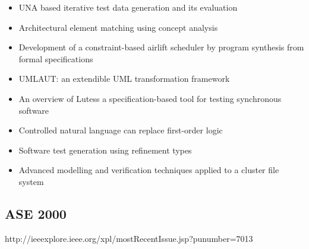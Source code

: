 {\begin{itemize}[itemsep=-1ex]
  \item UNA based iterative test data generation and its evaluation
  \item Architectural element matching using concept analysis
  \item Development of a constraint-based airlift scheduler by program synthesis from formal specifications
  \item UMLAUT: an extendible UML transformation framework
  \item An overview of Lutess a specification-based tool for testing synchronous software
  \item Controlled natural language can replace first-order logic
  \item Software test generation using refinement types
  \item Advanced modelling and verification techniques applied to a cluster file system 
\end{itemize}
}

\subsection{ASE 2000}

http://ieeexplore.ieee.org/xpl/mostRecentIssue.jsp?punumber=7013

